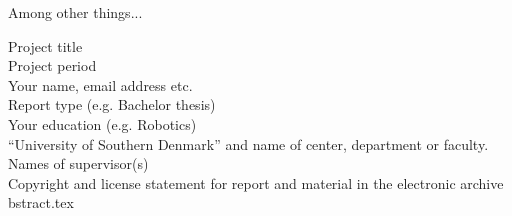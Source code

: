 
Among other things...

Project title \\
Project period \\
Your name, email address etc. \\
Report type  (e.g. Bachelor thesis) \\
Your education (e.g. Robotics) \\
“University of Southern Denmark” and name of center, department or faculty.
Names of supervisor(s) \\
Copyright and license statement for report and material in the electronic archive \\
bstract.tex

